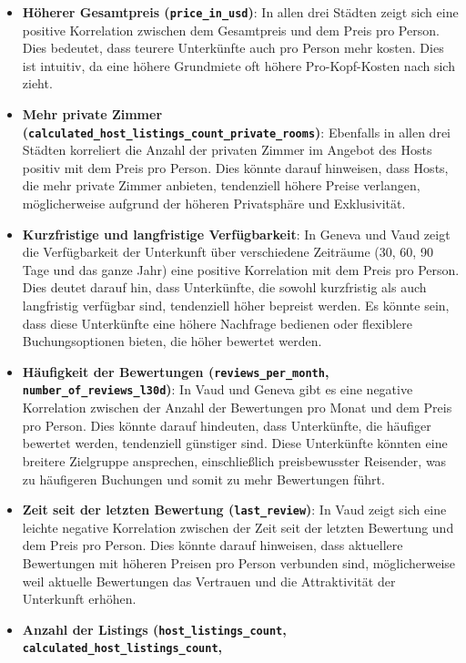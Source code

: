 \documentclass[
  journal,
]{IEEEtran}%
\begin{document}
\begin{itemize}
\item
  \textbf{Höherer Gesamtpreis (\texttt{price\_in\_usd})}: In allen drei
  Städten zeigt sich eine positive Korrelation zwischen dem Gesamtpreis
  und dem Preis pro Person. Dies bedeutet, dass teurere Unterkünfte auch
  pro Person mehr kosten. Dies ist intuitiv, da eine höhere Grundmiete
  oft höhere Pro-Kopf-Kosten nach sich zieht.
\item
  \textbf{Mehr private Zimmer
  (\texttt{calculated\_host\_listings\_count\_private\_rooms})}:
  Ebenfalls in allen drei Städten korreliert die Anzahl der privaten
  Zimmer im Angebot des Hosts positiv mit dem Preis pro Person. Dies
  könnte darauf hinweisen, dass Hosts, die mehr private Zimmer anbieten,
  tendenziell höhere Preise verlangen, möglicherweise aufgrund der
  höheren Privatsphäre und Exklusivität.
\item
  \textbf{Kurzfristige und langfristige Verfügbarkeit}: In Geneva und
  Vaud zeigt die Verfügbarkeit der Unterkunft über verschiedene
  Zeiträume (30, 60, 90 Tage und das ganze Jahr) eine positive
  Korrelation mit dem Preis pro Person. Dies deutet darauf hin, dass
  Unterkünfte, die sowohl kurzfristig als auch langfristig verfügbar
  sind, tendenziell höher bepreist werden. Es könnte sein, dass diese
  Unterkünfte eine höhere Nachfrage bedienen oder flexiblere
  Buchungsoptionen bieten, die höher bewertet werden.
\item
  \textbf{Häufigkeit der Bewertungen (\texttt{reviews\_per\_month},
  \texttt{number\_of\_reviews\_l30d})}: In Vaud und Geneva gibt es eine
  negative Korrelation zwischen der Anzahl der Bewertungen pro Monat und
  dem Preis pro Person. Dies könnte darauf hindeuten, dass Unterkünfte,
  die häufiger bewertet werden, tendenziell günstiger sind. Diese
  Unterkünfte könnten eine breitere Zielgruppe ansprechen,
  einschließlich preisbewusster Reisender, was zu häufigeren Buchungen
  und somit zu mehr Bewertungen führt.
\item
  \textbf{Zeit seit der letzten Bewertung (\texttt{last\_review})}: In
  Vaud zeigt sich eine leichte negative Korrelation zwischen der Zeit
  seit der letzten Bewertung und dem Preis pro Person. Dies könnte
  darauf hinweisen, dass aktuellere Bewertungen mit höheren Preisen pro
  Person verbunden sind, möglicherweise weil aktuelle Bewertungen das
  Vertrauen und die Attraktivität der Unterkunft erhöhen.
\item
  \textbf{Anzahl der Listings (\texttt{host\_listings\_count},
  \texttt{calculated\_host\_listings\_count},
}
\end{itemize}
\end{document}
